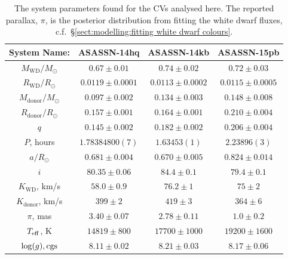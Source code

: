 \begin{table}
    \centering
    \caption{The system parameters found for the CVs analysed here. The reported parallax, $\pi$, is the posterior distribution from fitting the white dwarf fluxes, c.f.~\S\ref{sect:modelling:fitting white dwarf colours}.}
    \label{table:12 new cvs:system_parameters}
    \begin{tabular}{cccc}
        \hline
        \textbf{System Name:}      & \textbf{ASASSN-14hq}    & \textbf{ASASSN-14kb}     & \textbf{ASASSN-15pb}  \\
        \hline
        \hline
        $M_\mathrm{WD}/M_\odot$    & $0.67\pm0.01$           & $0.74\pm0.02$            & $0.72\pm0.03$         \\
        $R_\mathrm{WD}/R_\odot$    & $0.0119\pm0.0001$       & $0.0113\pm0.0002$        & $0.0115\pm0.0005$     \\
        $M_\mathrm{donor}/M_\odot$ & $0.097\pm0.002$         & $0.134\pm0.003$          & $0.148\pm0.008$       \\
        $R_\mathrm{donor}/R_\odot$ & $0.157\pm0.001$         & $0.164\pm0.001$          & $0.210\pm0.004$       \\
        $q$                        & $0.145\pm0.002$         & $0.182\pm0.002$          & $0.206\pm0.004$       \\
        \hline
        $P$, hours                 & $1.78384800(7)$         & $1.63453(1)$             & $2.23896(3)$          \\
        $a/R_\odot$                & $0.681\pm0.004$         & $0.670\pm0.005$          & $0.824\pm0.014$       \\
        $i$                        & $80.35\pm0.06$          & $84.4\pm0.1$             & $79.4\pm0.1$          \\
        $K_\mathrm{WD}$, km/s      & $58.0\pm0.9$            & $76.2\pm1$               & $75\pm2$              \\
        $K_\mathrm{donor}$, km/s   & $399\pm2$               & $419\pm3$                & $364\pm6$             \\
        \hline
        $\pi$, mas                 & $3.40\pm0.07$           & $2.78\pm0.11$            & $1.0\pm0.2$           \\
        $T_{\rm eff}$, K           & $14819\pm800$           & $17700\pm1000$           & $19200\pm1600$        \\
        $\log(g), {\rm cgs}$       & $8.11\pm0.02$           & $8.21\pm0.03$            & $8.17\pm0.06$         \\

\end{tabular}
\end{table}
